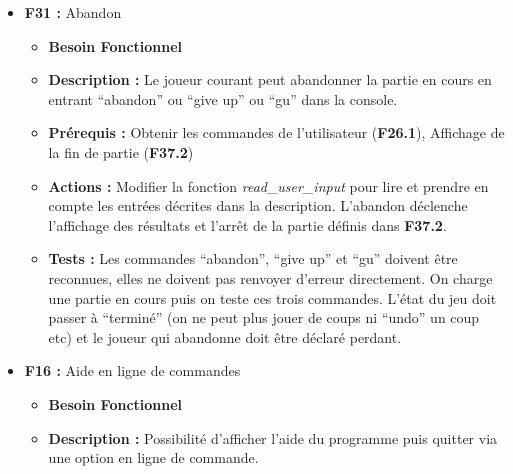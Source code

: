 \documentclass{article}
\begin{document}
\begin{itemize}
\begin{itemize}
\begin{itemize}
\begin{itemize}
            \end{itemize}
            \smallskip
            \item \textbf{F15.3 :} Code de retour de programme
            \begin{itemize}
                \item \textbf{Actions :} Renvoyer 1 en cas d’erreur sinon 0 en fin de programme.
                \item \textbf{Tests :} Exécuter le programme sur des entrées de sorte qu'il se termine en renvoyant un code d’erreur spécifique qu’il faudra vérifier (exemple : lancer avec ’-V’ et vérifier que le programme se termine avec un code 0).
            \end{itemize}
        \end{itemize}
    \end{itemize}
\bigskip
    \item \textbf{F31 :} Abandon
    \begin{itemize}
        \item \textbf{Besoin Fonctionnel}
        \item \textbf{Description :} Le joueur courant peut abandonner la partie en cours en entrant “abandon” ou “give up” ou “gu” dans la console.
        \item \textbf{Prérequis :} Obtenir les commandes de l’utilisateur (\textbf{F26.1}), Affichage de la fin de partie (\textbf{F37.2})
        \item \textbf{Actions :} Modifier la fonction \textit{read\_user\_input} pour lire et prendre en compte les entrées décrites dans la description. L’abandon déclenche l’affichage des résultats et l’arrêt de la partie définis dans \textbf{F37.2}.
        \item \textbf{Tests :} Les commandes “abandon”, “give up” et “gu” doivent être reconnues, elles ne doivent pas renvoyer d’erreur directement. On charge une partie en cours puis on teste ces trois commandes. L’état du jeu doit passer à “terminé” (on ne peut plus jouer de coups ni “undo” un coup etc) et le joueur qui abandonne doit être déclaré perdant.
    \end{itemize}
\bigskip
    \item \textbf{F16 :} Aide en ligne de commandes
    \begin{itemize}
        \item \textbf{Besoin Fonctionnel}
        \item \textbf{Description :} Possibilité d’afficher l’aide du programme puis quitter via une option en ligne de commande.

\end{itemize}
\end{itemize}
\end{document}
